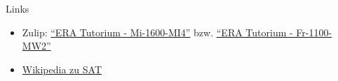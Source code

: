 \begin{frame}[fragile, c]{Links}{}
	\begin{itemize}
		\item Zulip: \href{https://zulip.in.tum.de/#narrow/stream/1917-ERA-Tutorium---Mi-1600-MI4}{\enquote{ERA Tutorium - Mi-1600-MI4}}
		      bzw. \href{https://zulip.in.tum.de/#narrow/stream/1940-ERA-Tutorium---Fr-1100-MW2}{\enquote{ERA Tutorium - Fr-1100-MW2}}
		\item \href{https://en.wikipedia.org/wiki/Boolean_satisfiability_problem}{Wikipedia zu SAT}
	\end{itemize}
\end{frame}

\maketitle


